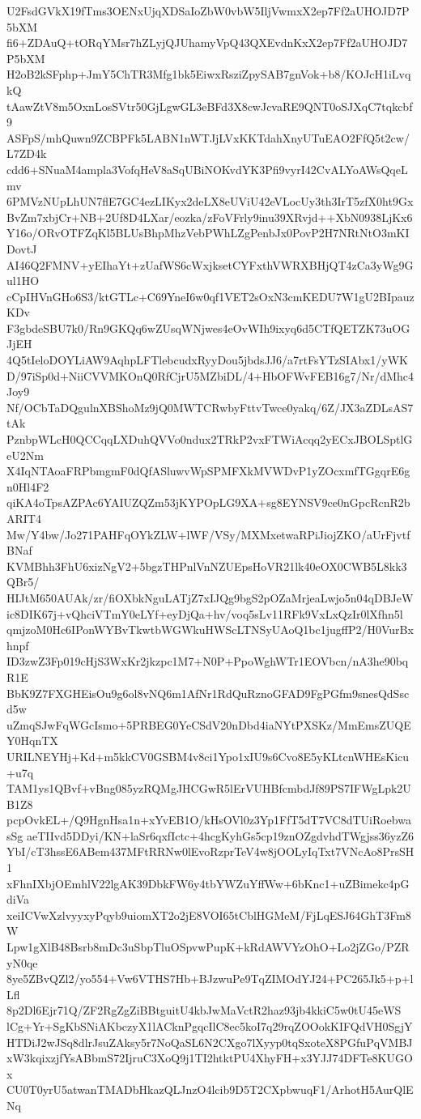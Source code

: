 U2FsdGVkX19fTms3OENxUjqXDSaIoZbW0vbW5IljVwmxX2ep7Ff2aUHOJD7P5bXM
fi6+ZDAuQ+tORqYMsr7hZLyjQJUhamyVpQ43QXEvdnKxX2ep7Ff2aUHOJD7P5bXM
H2oB2kSFphp+JmY5ChTR3Mfg1bk5EiwxRsziZpySAB7gnVok+b8/KOJcH1iLvqkQ
tAawZtV8m5OxnLosSVtr50GjLgwGL3eBFd3X8cwJcvaRE9QNT0oSJXqC7tqkcbf9
ASFpS/mhQuwn9ZCBPFk5LABN1nWTJjLVxKKTdahXnyUTuEAO2FfQ5t2cw/L7ZD4k
cdd6+SNuaM4ampla3VofqHeV8aSqUBiNOKvdYK3Pfi9vyrI42CvALYoAWsQqeLmv
6PMVzNUpLhUN7flE7GC4ezLIKyx2deLX8eUViU42eVLocUy3th3IrT5zfX0ht9Gx
BvZm7xbjCr+NB+2Uf8D4LXar/eozka/zFoVFrly9inu39XRvjd++XbN0938LjKx6
Y16o/ORvOTFZqKl5BLUsBhpMhzVebPWhLZgPenbJx0PovP2H7NRtNtO3mKIDovtJ
AI46Q2FMNV+yEIhaYt+zUafWS6cWxjksetCYFxthVWRXBHjQT4zCa3yWg9Gul1HO
cCpIHVnGHo6S3/ktGTLc+C69YneI6w0qf1VET2sOxN3cmKEDU7W1gU2BIpauzKDv
F3gbdeSBU7k0/Rn9GKQq6wZUsqWNjwes4eOvWIh9ixyq6d5CTfQETZK73uOGJjEH
4Q5tIeloDOYLiAW9AqhpLFTlebcudxRyyDou5jbdsJJ6/a7rtFsYTzSIAbx1/yWK
D/97iSp0d+NiiCVVMKOnQ0RfCjrU5MZbiDL/4+HbOFWvFEB16g7/Nr/dMhc4Joy9
Nf/OCbTaDQgulnXBShoMz9jQ0MWTCRwbyFttvTwce0yakq/6Z/JX3aZDLsAS7tAk
PznbpWLcH0QCCqqLXDuhQVVo0ndux2TRkP2vxFTWiAcqq2yECxJBOLSptlGeU2Nm
X4IqNTAoaFRPbmgmF0dQfASluwvWpSPMFXkMVWDvP1yZOcxmfTGgqrE6gn0Hl4F2
qiKA4oTpsAZPAc6YAIUZQZm53jKYPOpLG9XA+sg8EYNSV9ce0nGpcRcnR2bARIT4
Mw/Y4bw/Jo271PAHFqOYkZLW+lWF/VSy/MXMxetwaRPiJiojZKO/aUrFjvtfBNaf
KVMBhh3FhU6xizNgV2+5bgzTHPnlVnNZUEpsHoVR21lk40eOX0CWB5L8kk3QBr5/
HIJtM650AUAk/zr/fiOXbkNguLATjZ7xIJQg9bgS2pOZaMrjeaLwjo5n04qDBJeW
ic8DIK67j+vQhciVTmY0eLYf+eyDjQa+hv/voq5sLv11RFk9VxLxQzIr0lXfhn5l
qmjzoM0Hc6IPonWYBvTkwtbWGWkuHWScLTNSyUAoQ1bc1jugffP2/H0VurBxhnpf
ID3zwZ3Fp019cHjS3WxKr2jkzpc1M7+N0P+PpoWghWTr1EOVbcn/nA3he90bqR1E
BbK9Z7FXGHEisOu9g6ol8vNQ6m1AfNr1RdQuRznoGFAD9FgPGfm9snesQdSscd5w
uZmqSJwFqWGcIsmo+5PRBEG0YeCSdV20nDbd4iaNYtPXSKz/MmEmsZUQEY0HqnTX
URILNEYHj+Kd+m5kkCV0GSBM4v8ci1Ypo1xIU9s6Cvo8E5yKLtcnWHEsKicu+u7q
TAM1ys1QBvf+vBng085yzRQMgJHCGwR5lErVUHBfcmbdJf89PS7IFWgLpk2UB1Z8
pcpOvkEL+/Q9HgnHsa1n+xYvEB1O/kHsOVl0z3Yp1FfT5dT7VC8dTUiRoebwasSg
aeTIIvd5DDyi/KN+laSr6qxfIctc+4hcgKyhGs5cp19znOZgdvhdTWgjss36yzZ6
YbI/cT3hssE6ABem437MFtRRNw0lEvoRzprTeV4w8jOOLyIqTxt7VNcAo8PrsSH1
xFhnIXbjOEmhlV22lgAK39DbkFW6y4tbYWZuYffWw+6bKnc1+uZBimekc4pGdiVa
xeiICVwXzlvyyxyPqyb9uiomXT2o2jE8VOI65tCblHGMeM/FjLqESJ64GhT3Fm8W
Lpw1gXlB48Bsrb8mDc3uSbpTluOSpvwPupK+kRdAWVYzOhO+Lo2jZGo/PZRyN0qe
8ye5ZBvQZl2/yo554+Vw6VTHS7Hb+BJzwuPe9TqZIMOdYJ24+PC265Jk5+p+lLfl
8p2Dl6Ejr71Q/ZF2RgZgZiBBtguitU4kbJwMaVctR2haz93jb4kkiC5w0tU45eWS
lCg+Yr+SgKbSNiAKbczyX1lACknPgqcIlC8ec5koI7q29rqZOOokKIFQdVH0SgjY
HTDiJ2wJSq8dlrJsuZAksy5r7NoQaSL6N2CXgo7lXyyp0tqSxoteX8PGfuPqVMBJ
xW3kqixzjfYsABbmS72IjruC3XoQ9j1TI2htktPU4XhyFH+x3YJJ74DFTe8KUGOx
CU0T0yrU5atwanTMADbHkazQLJnzO4lcib9D5T2CXpbwuqF1/ArhotH5AurQlENq
